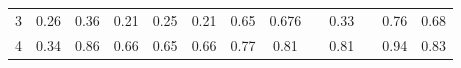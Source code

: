\documentclass[twoside,11pt]{article}
\begin{document}
\begin{table}[H]
{\begin{tabular}{cccccccclclcc}
\multicolumn{1}{|c|}{3}                                                                           & \multicolumn{1}{c|}{0.26}                                                           & \multicolumn{1}{c|}{0.36}                                                                      & \multicolumn{1}{c|}{0.21}                                                                & \multicolumn{1}{c|}{0.25}                                                                & \multicolumn{1}{c|}{0.21}                                                                & \multicolumn{1}{c|}{\cellcolor[HTML]{ECF4FF}0.65}                                           & \multicolumn{1}{c|}{\cellcolor[HTML]{FFCCC9}0.676}                                          & \multicolumn{1}{l|}{}                                                                          & \multicolumn{1}{c|}{0.33}                                                                   & \multicolumn{1}{l|}{}                    & \multicolumn{1}{c|}{0.76}                                                                      & \multicolumn{1}{c|}{0.68}                                                                      \\ \cline{1-1}
\multicolumn{1}{|c|}{4}                                                                           & \multicolumn{1}{c|}{0.34}                                                           & \multicolumn{1}{c|}{\cellcolor[HTML]{FFCCC9}0.86}                                              & \multicolumn{1}{c|}{0.66}                                                                & \multicolumn{1}{c|}{0.65}                                                                & \multicolumn{1}{c|}{0.66}                                                                & \multicolumn{1}{c|}{0.77}                                                                   & \multicolumn{1}{c|}{\cellcolor[HTML]{ECF4FF}0.81}                                           & \multicolumn{1}{l|}{}                                                                          & \multicolumn{1}{c|}{0.81}                                                                   & \multicolumn{1}{l|}{}                    & \multicolumn{1}{c|}{0.94}                                                                      & \multicolumn{1}{c|}{0.83}                                                                      \\ \cline{1-1}

\end{tabular}}
\end{table}
\end{document}
